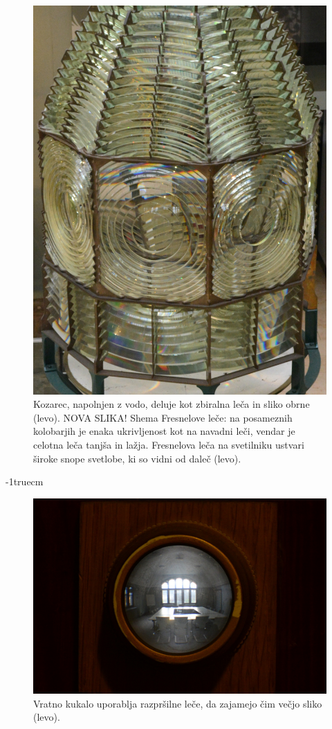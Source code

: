 \begin{figure}[!ht]
\includegraphics[height=7truecm]{slike/02_photos_svetilnik.jpg}
\caption{Kozarec, napolnjen z vodo, deluje kot zbiralna leča in 
sliko obrne (levo). NOVA SLIKA! Shema Fresnelove leče: na posameznih
kolobarjih je enaka ukrivljenost kot na navadni leči, vendar je celotna 
leča tanjša in lažja. Fresnelova leča na svetilniku ustvari široke 
snope svetlobe, ki so vidni od daleč (levo).}
\label{fig:02_photos-2}
\end{figure}
\vglue-1truecm
\begin{figure}[!ht]
\centering
\includegraphics[width=8truecm]{slike/02_photos_peephole.jpg}
\caption{Vratno kukalo uporablja razpršilne leče, da zajamejo čim večjo sliko (levo).}
\label{fig:02_photos-3}
\end{figure}

